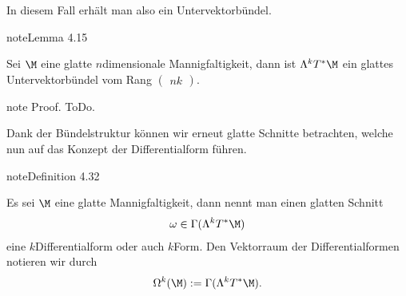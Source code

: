 \documentclass[letterpaper,10pt,english]{jupyterBook}
\begin{document}
\sphinxAtStartPar
In diesem Fall erhält man also ein Untervektorbündel.
\label{manifolds/diffformen:lemma-1}
\begin{sphinxadmonition}{note}{Lemma 4.15}



\sphinxAtStartPar
Sei \(\M\) eine glatte \(n\)\sphinxhyphen{}dimensionale Mannigfaltigkeit, dann ist \(\Lambda^k T^\ast\M\) ein glattes Untervektorbündel vom Rang \(\begin{pmatrix} n k \end{pmatrix}\).
\end{sphinxadmonition}

\begin{sphinxadmonition}{note}
\sphinxAtStartPar
Proof. ToDo.
\end{sphinxadmonition}

\sphinxAtStartPar
Dank der Bündelstruktur können wir erneut glatte Schnitte betrachten, welche nun auf das Konzept der Differentialform führen.
\label{manifolds/diffformen:definition-2}
\begin{sphinxadmonition}{note}{Definition 4.32}



\sphinxAtStartPar
Es sei \(\M\) eine glatte Mannigfaltigkeit, dann nennt man einen glatten Schnitt
\begin{equation*}
\begin{split}\omega\in \Gamma(\Lambda^k T^\ast\M)\end{split}
\end{equation*}
\sphinxAtStartPar
eine \(k\)\sphinxhyphen{}Differentialform oder auch \(k\)\sphinxhyphen{}Form. Den Vektorraum der Differentialformen notieren wir durch
\begin{equation*}
\begin{split}\Omega^k(\M) := \Gamma(\Lambda^k T^\ast\M).\end{split}
\end{equation*}\end{sphinxadmonition}
\end{document}

